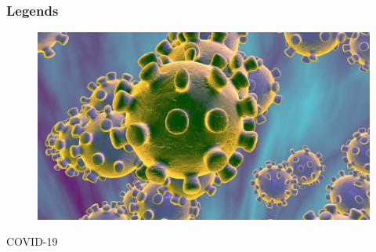 \documentclass{../c-lecture}
\begin{document}
\begin{frame}
  \frametitle{Legends}
  \begin{figure}
    \includegraphics[height=.75\textheight]{./img/coronavirus.jpg}
  \end{figure}
  \pause%
  \centering
  \color{Violet} COVID-19
\end{frame}
\end{document}
